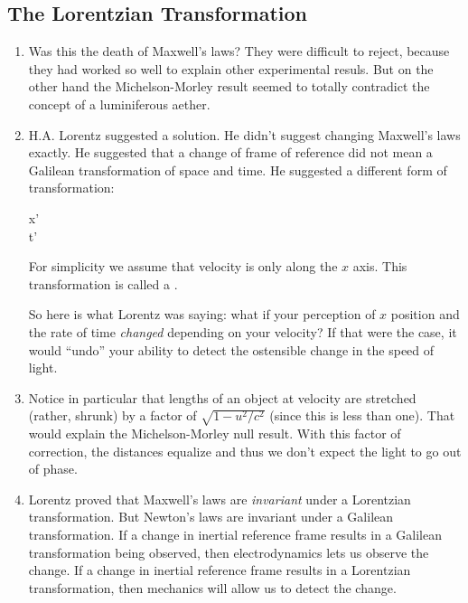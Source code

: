 \subsection{The Lorentzian Transformation}

\begin{enumerate}

  \item Was this the death of Maxwell's laws? They were difficult to
  reject, because they had worked so well to explain other experimental
  resuls. But on the other hand the Michelson-Morley result seemed to
  totally contradict the concept of a luminiferous aether.

  \item H.A. Lorentz suggested a solution. He didn't suggest changing
  Maxwell's laws exactly. He suggested that a change of frame of
  reference did not mean a Galilean transformation of space and time. He
  suggested a different form of transformation:

  \begin{nedqn}
    x'
  \eqcol
  \\
    t'
  \eqcol
  \end{nedqn}

  For simplicity we assume that velocity is only along the $x$ axis.
  This transformation is called a .

  So here is what Lorentz was saying: what if your perception of $x$
  position and the rate of time \emph{changed} depending on your
  velocity? If that were the case, it would ``undo'' your ability to
  detect the ostensible change in the speed of light.

  \item Notice in particular that lengths of an object at velocity are
  stretched (rather, shrunk) by a factor of $\sqrt{1 - u^2/c^2}$ (since
  this is less than one). That would explain the Michelson-Morley null
  result. With this factor of correction, the distances equalize and
  thus we don't expect the light to go out of phase.

  \item Lorentz proved that Maxwell's laws are \emph{invariant} under a
  Lorentzian transformation. But Newton's laws are invariant under a
  Galilean transformation. If a change in inertial reference frame
  results in a Galilean transformation being observed, then
  electrodynamics lets us observe the change. If a change in inertial
  reference frame results in a Lorentzian transformation, then mechanics
  will allow us to detect the change.


\end{enumerate}
